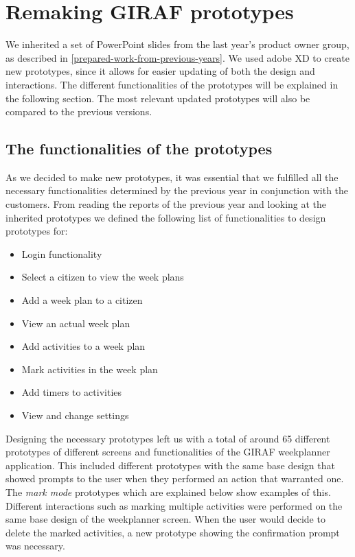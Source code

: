 \section{Remaking GIRAF prototypes}\label{prototype-comp}
We inherited a set of PowerPoint slides from the last year's product owner group, as described in \autoref{prepared-work-from-previous-years}.
We used adobe XD to create new prototypes, since it allows for easier updating of both the design and interactions.
The different functionalities of the prototypes will be explained in the following section.
The most relevant updated prototypes will also be compared to the previous versions.

\subsection{The functionalities of the prototypes}
As we decided to make new prototypes, it was essential that we fulfilled all the necessary functionalities determined by the previous year in conjunction with the customers.
From reading the reports of the previous year and looking at the inherited prototypes we defined the following list of functionalities to design prototypes for:
\begin{itemize}
    \item Login functionality
    \item Select a citizen to view the week plans
    \item Add a week plan to a citizen
    \item View an actual week plan
    \item Add activities to a week plan
    \item Mark activities in the week plan
    \item Add timers to activities
    \item View and change settings
\end{itemize}
Designing the necessary prototypes left us with a total of around 65 different prototypes of different screens and functionalities of the GIRAF weekplanner application.
This included different prototypes with the same base design that showed prompts to the user when they performed an action that warranted one.
The \textit{mark mode} prototypes which are explained below show examples of this. 
Different interactions such as marking multiple activities were performed on the same base design of the weekplanner screen.
When the user would decide to delete the marked activities, a new prototype showing the confirmation prompt was necessary.

